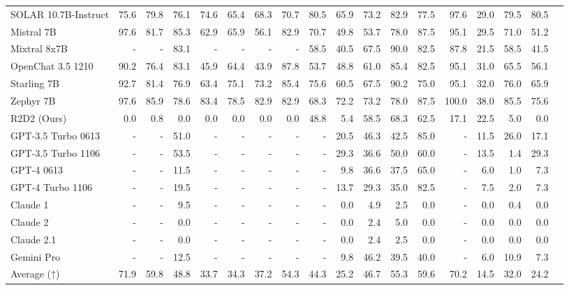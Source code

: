 \begin{table}
\begin{tabular}{l|rrrrrrrrrrrrrrrrr}
SOLAR 10.7B-Instruct &75.6 &79.8 &76.1 &74.6 &65.4 &68.3 &70.7 &80.5 &65.9 &73.2 &82.9 &77.5 &97.6 &29.0 &79.5 &80.5 \\
Mistral 7B &97.6 &81.7 &85.3 &62.9 &65.9 &56.1 &82.9 &70.7 &49.8 &53.7 &78.0 &87.5 &95.1 &29.5 &71.0 &51.2 \\
Mixtral 8x7B &- &- &83.1 &- &- &- &- &58.5 &40.5 &67.5 &90.0 &82.5 &87.8 &21.5 &58.5 &41.5 \\
OpenChat 3.5 1210 &90.2 &76.4 &83.1 &45.9 &64.4 &43.9 &87.8 &53.7 &48.8 &61.0 &85.4 &82.5 &95.1 &31.0 &65.5 &56.1 \\
Starling 7B &92.7 &81.4 &76.9 &63.4 &75.1 &73.2 &85.4 &75.6 &60.5 &67.5 &90.2 &75.0 &95.1 &32.0 &76.0 &65.9 \\
Zephyr 7B &97.6 &85.9 &78.6 &83.4 &78.5 &82.9 &82.9 &68.3 &72.2 &73.2 &78.0 &87.5 &100.0 &38.0 &85.5 &75.6 \\
R2D2 (Ours) &0.0 &0.8 &0.0 &0.0 &0.0 &0.0 &0.0 &48.8 &5.4 &58.5 &68.3 &62.5 &17.1 &22.5 &5.0 &0.0 \\ \midrule
GPT-3.5 Turbo 0613 &- &- &51.0 &- &- &- &- &- &20.5 &46.3 &42.5 &85.0 &- &11.5 &26.0 &17.1 \\
GPT-3.5 Turbo 1106 &- &- &53.5 &- &- &- &- &- &29.3 &36.6 &50.0 &60.0 &- &13.5 &1.4 &29.3 \\
GPT-4 0613 &- &- &11.5 &- &- &- &- &- &9.8 &36.6 &37.5 &65.0 &- &6.0 &1.0 &7.3 \\
GPT-4 Turbo 1106 &- &- &19.5 &- &- &- &- &- &13.7 &29.3 &35.0 &82.5 &- &7.5 &2.0 &7.3 \\
Claude 1 &- &- &9.5 &- &- &- &- &- &0.0 &4.9 &2.5 &0.0 &- &0.0 &0.4 &0.0 \\
Claude 2 &- &- &0.0 &- &- &- &- &- &0.0 &2.4 &5.0 &0.0 &- &0.0 &0.0 &0.0 \\
Claude 2.1 &- &- &0.0 &- &- &- &- &- &0.0 &2.4 &2.5 &0.0 &- &0.0 &0.0 &0.0 \\
Gemini Pro &- &- &12.5 &- &- &- &- &- &9.8 &46.2 &39.5 &40.0 &- &6.0 &10.9 &7.3 \\
Average (↑) &71.9 &59.8 &48.8 &33.7 &34.3 &37.2 &54.3 &44.3 &25.2 &46.7 &55.3 &59.6 &70.2 &14.5 &32.0 &24.2 \\
\bottomrule
\end{tabular}
\end{table}

